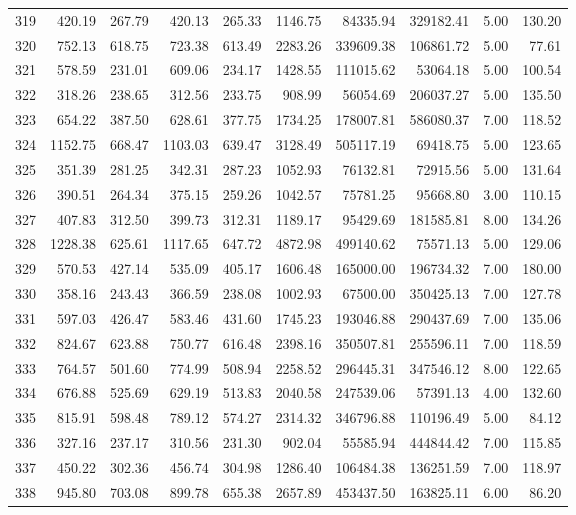 \begin{tabular}{lrrrrrrrrr}
319 & 420.19 & 267.79 & 420.13 & 265.33 & 1146.75 & 84335.94 & 329182.41 & 5.00 & 130.20 \\
320 & 752.13 & 618.75 & 723.38 & 613.49 & 2283.26 & 339609.38 & 106861.72 & 5.00 & 77.61 \\
321 & 578.59 & 231.01 & 609.06 & 234.17 & 1428.55 & 111015.62 & 53064.18 & 5.00 & 100.54 \\
322 & 318.26 & 238.65 & 312.56 & 233.75 & 908.99 & 56054.69 & 206037.27 & 5.00 & 135.50 \\
323 & 654.22 & 387.50 & 628.61 & 377.75 & 1734.25 & 178007.81 & 586080.37 & 7.00 & 118.52 \\
324 & 1152.75 & 668.47 & 1103.03 & 639.47 & 3128.49 & 505117.19 & 69418.75 & 5.00 & 123.65 \\
325 & 351.39 & 281.25 & 342.31 & 287.23 & 1052.93 & 76132.81 & 72915.56 & 5.00 & 131.64 \\
326 & 390.51 & 264.34 & 375.15 & 259.26 & 1042.57 & 75781.25 & 95668.80 & 3.00 & 110.15 \\
327 & 407.83 & 312.50 & 399.73 & 312.31 & 1189.17 & 95429.69 & 181585.81 & 8.00 & 134.26 \\
328 & 1228.38 & 625.61 & 1117.65 & 647.72 & 4872.98 & 499140.62 & 75571.13 & 5.00 & 129.06 \\
329 & 570.53 & 427.14 & 535.09 & 405.17 & 1606.48 & 165000.00 & 196734.32 & 7.00 & 180.00 \\
330 & 358.16 & 243.43 & 366.59 & 238.08 & 1002.93 & 67500.00 & 350425.13 & 7.00 & 127.78 \\
331 & 597.03 & 426.47 & 583.46 & 431.60 & 1745.23 & 193046.88 & 290437.69 & 7.00 & 135.06 \\
332 & 824.67 & 623.88 & 750.77 & 616.48 & 2398.16 & 350507.81 & 255596.11 & 7.00 & 118.59 \\
333 & 764.57 & 501.60 & 774.99 & 508.94 & 2258.52 & 296445.31 & 347546.12 & 8.00 & 122.65 \\
334 & 676.88 & 525.69 & 629.19 & 513.83 & 2040.58 & 247539.06 & 57391.13 & 4.00 & 132.60 \\
335 & 815.91 & 598.48 & 789.12 & 574.27 & 2314.32 & 346796.88 & 110196.49 & 5.00 & 84.12 \\
336 & 327.16 & 237.17 & 310.56 & 231.30 & 902.04 & 55585.94 & 444844.42 & 7.00 & 115.85 \\
337 & 450.22 & 302.36 & 456.74 & 304.98 & 1286.40 & 106484.38 & 136251.59 & 7.00 & 118.97 \\
338 & 945.80 & 703.08 & 899.78 & 655.38 & 2657.89 & 453437.50 & 163825.11 & 6.00 & 86.20 \\

\end{tabular}
